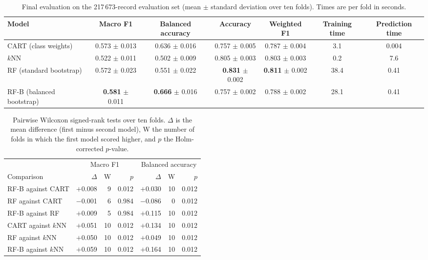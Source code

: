\documentclass[conference,10pt]{IEEEtran}
\begin{document}
\begin{table}[t]
\centering
\caption{Final evaluation on the 217\,673-record evaluation set (mean $\pm$ standard deviation over ten folds). Times are per fold in seconds.}
\label{tab:final}
\begin{tabular}{lcccccc}
\toprule
Model & Macro F1 & Balanced accuracy & Accuracy & Weighted F1 & Training time & Prediction time \\
\midrule
CART (class weights) & 0.573 $\pm$ 0.013 & 0.636 $\pm$ 0.016 & 0.757 $\pm$ 0.005 & 0.787 $\pm$ 0.004 & 3.1 & 0.004 \\
$k$NN & 0.522 $\pm$ 0.011 & 0.502 $\pm$ 0.009 & 0.805 $\pm$ 0.003 & 0.803 $\pm$ 0.003 & 0.2 & 7.6 \\
RF (standard bootstrap) & 0.572 $\pm$ 0.023 & 0.551 $\pm$ 0.022 & \textbf{0.831} $\pm$ 0.002 & \textbf{0.811} $\pm$ 0.002 & 38.4 & 0.41 \\
RF-B (balanced bootstrap) & \textbf{0.581} $\pm$ 0.011 & \textbf{0.666} $\pm$ 0.016 & 0.757 $\pm$ 0.002 & 0.788 $\pm$ 0.002 & 28.1 & 0.41 \\
\bottomrule
\end{tabular}
\end{table}

\begin{table}[t]
\centering
\caption{Pairwise Wilcoxon signed-rank tests over ten folds. $\Delta$ is the mean difference (first minus second model), W the number of folds in which the first model scored higher, and $p$ the Holm-corrected $p$-value.}
\label{tab:tests}
\setlength{\tabcolsep}{3.5pt}
\begin{tabular}{lrrrrrr}
\toprule
& \multicolumn{3}{c}{Macro F1} & \multicolumn{3}{c}{Balanced accuracy} \\
\cmidrule(lr){2-4}\cmidrule(lr){5-7}
Comparison & $\Delta$ & W & $p$ & $\Delta$ & W & $p$ \\
\midrule
RF-B against CART & $+$0.008 & 9 & 0.012 & $+$0.030 & 10 & 0.012 \\
RF against CART & $-$0.001 & 6 & 0.984 & $-$0.086 & 0 & 0.012 \\
RF-B against RF & $+$0.009 & 5 & 0.984 & $+$0.115 & 10 & 0.012 \\
CART against $k$NN & $+$0.051 & 10 & 0.012 & $+$0.134 & 10 & 0.012 \\
RF against $k$NN & $+$0.050 & 10 & 0.012 & $+$0.049 & 10 & 0.012 \\
RF-B against $k$NN & $+$0.059 & 10 & 0.012 & $+$0.164 & 10 & 0.012 \\
\bottomrule
\end{tabular}
\end{table}
\end{document}
